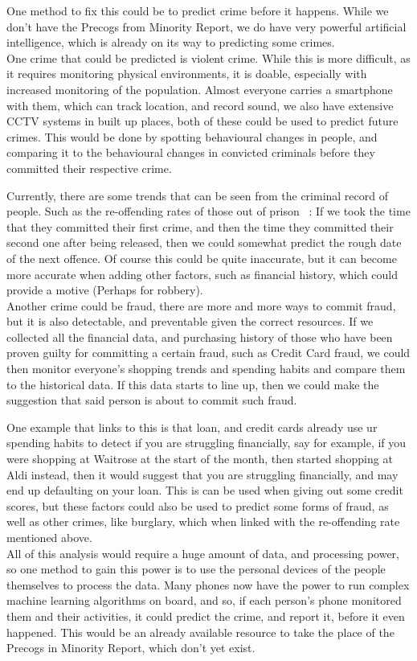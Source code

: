 
One method to fix this could be to predict crime before it happens.
While we don't have the Precogs from Minority Report, we do have very powerful artificial intelligence, which is
already on its way to predicting some crimes.
\\

One crime that could be predicted is violent crime.
While this is more difficult, as it requires monitoring physical environments, it is doable, especially with
increased monitoring of the population.
Almost everyone carries a smartphone with them, which can track location, and record sound, we also have extensive
CCTV systems in built up places, both of these could be used to predict future crimes.
This would be done by spotting behavioural changes in people, and comparing it to the behavioural changes in
convicted criminals before they committed their respective crime.

Currently, there are some trends that can be seen from the criminal record of people.
Such as the re-offending rates of those out of prison ~\cite{dci-walker}: If we took the time that they committed
their first crime, and then the time they committed their second one after being released, then we could somewhat
predict the rough date of the next offence.
Of course this could be quite inaccurate, but it can become more accurate when adding other factors, such as
financial history, which could provide a motive (Perhaps for robbery).
\\

Another crime could be fraud, there are more and more ways to commit fraud, but it is also detectable, and preventable
given the correct resources.
If we collected all the financial data, and purchasing history of those who have been proven guilty for
committing a certain fraud, such as Credit Card fraud, we could then monitor everyone's shopping trends and spending
habits and compare them to the historical data.
If this data starts to line up, then we could make the suggestion that said person is about to commit such fraud.

One example that links to this is that loan, and credit cards already use ur spending habits to detect if you are
struggling financially, say for example, if you were shopping at Waitrose at the start of the month, then started
shopping at Aldi instead, then it would suggest that you are struggling financially, and may end up defaulting on
your loan.
This is can be used when giving out some credit scores, but these factors could also be used to predict some forms
of fraud, as well as other crimes, like burglary, which when linked with the re-offending rate mentioned above.
\\

All of this analysis would require a huge amount of data, and processing power, so one method to gain this power
is to use the personal devices of the people themselves to process the data.
Many phones now have the power to run complex machine learning algorithms on board, and so, if each person's phone
monitored them and their activities, it could predict the crime, and report it, before it even happened.
This would be an already available resource to take the place of the Precogs in Minority Report, which don't yet
exist.